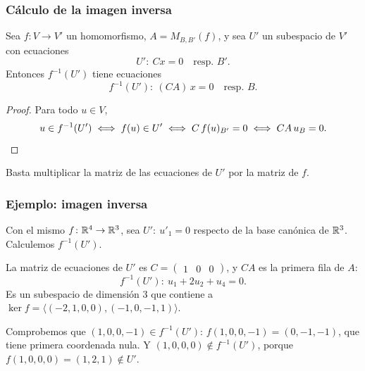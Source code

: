 \begin{frame}
    \frametitle{Cálculo de la imagen inversa}

    \begin{proposition}
        Sea $f\colon V\to V'$ un homomorfismo, $A=M_{B,B'}(f)$, y sea
        $U'$ un subespacio de $V'$ con ecuaciones
        \[
            U'\colon\ Cx=0\quad\text{resp.\ }B'.
        \]
        Entonces $f^{-1}(U')$ tiene ecuaciones
        \[
            f^{-1}(U')\colon\ (CA)\,x=0\quad\text{resp.\ }B.
        \]
    \end{proposition}

    \begin{proof}
        Para todo $u\in V$,
        \[
            u\in f^{-1}(U')\iff f(u)\in U'
            \iff C\,f(u)_{B'}=0\iff C A\,u_B=0.\qedhere
        \]
    \end{proof}

    \medskip

    Basta \alert{multiplicar} la matriz de las ecuaciones de $U'$ por la
    matriz de $f$.
\end{frame}


\begin{frame}
    \frametitle{Ejemplo: imagen inversa}

    \begin{example}
        Con el mismo $f\colon\mathbb{R}^4\to\mathbb{R}^3$, sea
        $U'\colon\ u'_1=0$ respecto de la base canónica de $\mathbb{R}^3$.
        Calculemos $f^{-1}(U')$.
    \end{example}

    La matriz de ecuaciones de $U'$ es $C=\begin{pmatrix}1&0&0\end{pmatrix}$,
    y $CA$ es la primera fila de $A$:
    \[
        f^{-1}(U')\colon\ u_1+2u_2+u_4=0.
    \]
    Es un subespacio de dimensión $3$ que contiene a
    $\ker f=\langle(-2,1,0,0),(-1,0,-1,1)\rangle$.

    \medskip

    Comprobemos que $(1,0,0,-1)\in f^{-1}(U')$: $f(1,0,0,-1)=(0,-1,-1)$,
    que tiene primera coordenada nula. Y $(1,0,0,0)\notin f^{-1}(U')$,
    porque $f(1,0,0,0)=(1,2,1)\notin U'$.
\end{frame}


